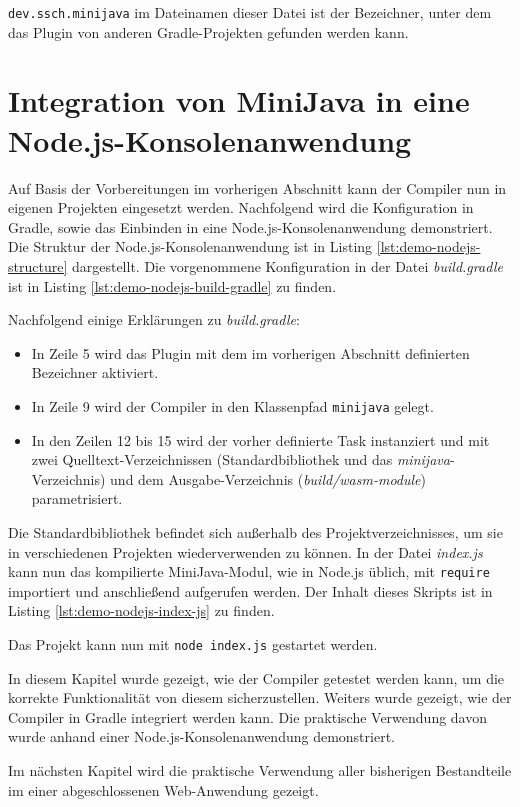\lstinline{dev.ssch.minijava} im Dateinamen dieser Datei ist der Bezeichner, unter dem das Plugin von anderen Gradle-Projekten gefunden werden kann.

\pagebreak
\section{Integration von MiniJava in eine Node.js-Konsolenanwendung}
\label{sec:NodeJSExample}

Auf Basis der Vorbereitungen im vorherigen Abschnitt kann der Compiler nun in eigenen Projekten eingesetzt werden. Nachfolgend wird die Konfiguration in Gradle, sowie das Einbinden in eine Node.js-Konsolenanwendung demonstriert. Die Struktur der Node.js-Konsolenanwendung ist in Listing \ref{lst:demo-nodejs-structure} dargestellt. Die vorgenommene Konfiguration in der Datei \emph{build.gradle} ist in Listing \ref{lst:demo-nodejs-build-gradle} zu finden.





Nachfolgend einige Erklärungen zu \emph{build.gradle}:
\begin{itemize}
    \item In Zeile 5 wird das Plugin mit dem im vorherigen Abschnitt definierten Bezeichner aktiviert.
    \item In Zeile 9 wird der Compiler in den Klassenpfad \lstinline{minijava} gelegt.
    \item In den Zeilen 12 bis 15 wird der vorher definierte Task instanziert und mit zwei Quelltext-Verzeichnissen (Standardbibliothek und das \emph{minijava}-Verzeichnis) und dem Ausgabe-Verzeichnis (\emph{build/wasm-module}) parametrisiert.
\end{itemize}

Die Standardbibliothek befindet sich außerhalb des Projektverzeichnisses, um sie in verschiedenen Projekten wiederverwenden zu können. In der Datei \emph{index.js} kann nun das kompilierte MiniJava-Modul, wie in Node.js üblich, mit \lstinline{require} importiert und anschließend aufgerufen werden. Der Inhalt dieses Skripts ist in Listing \ref{lst:demo-nodejs-index-js} zu finden.

\pagebreak


Das Projekt kann nun mit \lstinline{node index.js} gestartet werden.

\vspace{4em}
In diesem Kapitel wurde gezeigt, wie der Compiler getestet werden kann, um die korrekte Funktionalität von diesem sicherzustellen. Weiters wurde gezeigt, wie der Compiler in Gradle integriert werden kann. Die praktische Verwendung davon wurde anhand einer Node.js-Konsolenanwendung demonstriert.

Im nächsten Kapitel wird die praktische Verwendung aller bisherigen Bestandteile im einer abgeschlossenen Web-Anwendung gezeigt.
